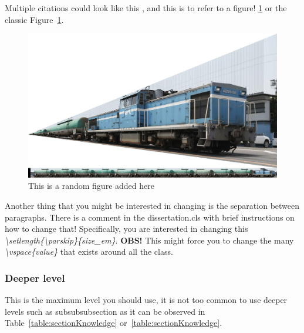 Multiple citations could look like this \cite{alvarez2020-designerpersonas,yannakakis2014micc}, and this is to refer to a figure! \cref{fig:myRNDFig} or the classic Figure~\ref{fig:myRNDFig}.

\begin{figure}[h]
    \centering
    \includegraphics[width=\linewidth]{figures/example-1.jpg}
        \caption{This is a random figure added here}
    \label{fig:myRNDFig}
\end{figure}

Another thing that you might be interested in changing is the separation between paragraphs. There is a comment in the dissertation.cls with brief instructions on how to change that! Specifically, you are interested in changing this \textit{\textbackslash{setlength}\{\textbackslash{parskip}\}\{size\_em\}}. \textbf{OBS!} This might force you to change the many \textit{\textbackslash{vspace}\{value\}} that exists around all the class. 

\subsubsection{Deeper level}

This is the maximum level you should use, it is not too common to use deeper levels such as subsubsubsection as it can be observed in Table~\ref{table:sectionKnowledge} or~\cref{table:sectionKnowledge}.

\blindtext

